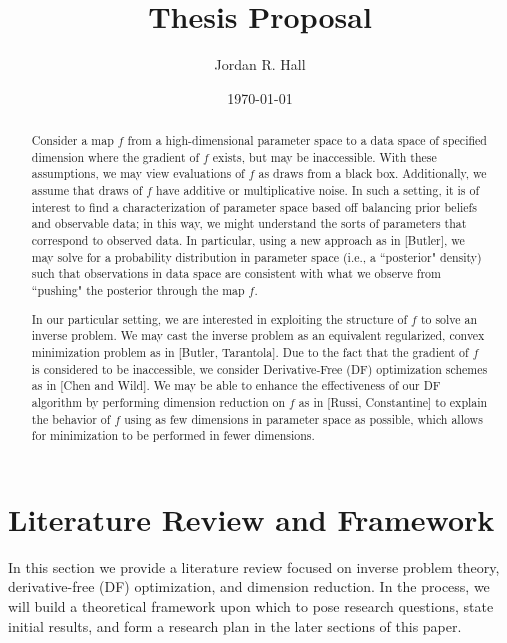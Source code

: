 \documentclass{report}
\begin{document}
\title{\bf Thesis Proposal}

\author{Jordan R. Hall}
\date{\today}

\maketitle

\begin{abstract}

Consider a map $f$ from a high-dimensional parameter space to a data space of specified dimension where the gradient of $f$ exists, but may be inaccessible. With these assumptions, we may view evaluations of $f$ as draws from a black box. Additionally, we assume that draws of $f$ have additive or multiplicative noise. In such a setting, it is of interest to find a characterization of parameter space based off balancing prior beliefs and observable data; in this way, we might understand the sorts of parameters that correspond to observed data. In particular, using a new approach as in [Butler], we may solve for a probability distribution in parameter space (i.e., a ``posterior" density) such that observations in data space are consistent with what we observe from ``pushing" the posterior through the map $f$.

In our particular setting, we are interested in exploiting the structure of $f$ to solve an inverse problem. We may cast the inverse problem as an equivalent regularized, convex minimization problem as in [Butler, Tarantola]. Due to the fact that the gradient of $f$ is considered to be inaccessible, we consider Derivative-Free (DF) optimization schemes as in [Chen and Wild]. We may be able to enhance the effectiveness of our DF algorithm by performing dimension reduction on $f$ as in [Russi, Constantine] to explain the behavior of $f$ using as few dimensions in parameter space as possible, which allows for minimization to be performed in fewer dimensions. 



 
\end{abstract}





\tableofcontents

\newpage
\section{Literature Review and Framework}

In this section we provide a literature review focused on inverse problem theory, derivative-free (DF) optimization, and dimension reduction. In the process, we will build a theoretical framework upon which to pose research questions, state initial results, and form a research plan in the later sections of this paper.
\end{document}
